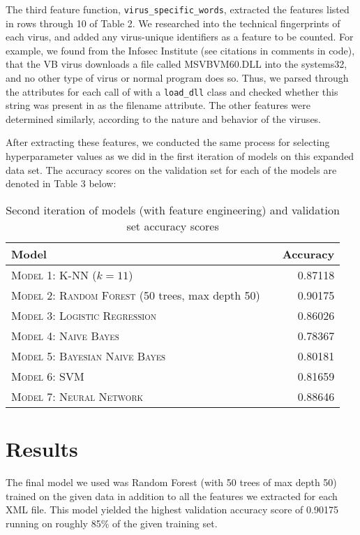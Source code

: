 \documentclass[11pt]{article}
\begin{document}
    The third feature function, \texttt{virus\_specific\_words}, extracted the features listed in rows through 10 of Table 2. We researched into the technical fingerprints of each virus, and added any virus-unique identifiers as a feature to be counted. For example, we found from the Infosec Institute (see citations in comments in code), that the VB virus downloads a file called MSVBVM60.DLL into the systems32, and no other type of virus or normal program does so. Thus, we parsed through the attributes for each call of with a \texttt{load\_dll} class and checked whether this string was present in as the filename attribute. The other features were determined similarly, according to the nature and behavior of the viruses.
    
    After extracting these features, we conducted the same process for selecting hyperparameter values as we did in the first iteration of models on this expanded data set. The accuracy scores on the validation set for each of the models are denoted in Table 3 below:
    \begin{table}[h!]
        \centering
        \begin{tabular}{llr}
         \toprule
         Model &  & Accuracy \\
         \midrule
         \textsc{Model 1: K-NN} ($k=11$) & & 0.87118 \\
         \textsc{Model 2: Random Forest} (50 trees, max depth 50) & & 0.90175\\
         \textsc{Model 3: Logistic Regression} & & 0.86026 \\
         \textsc{Model 4: Naive Bayes} & & 0.78367 \\
         \textsc{Model 5: Bayesian Naive Bayes} & &  0.80181\\
         \textsc{Model 6: SVM} & &  0.81659\\
         \textsc{Model 7: Neural Network} & & 0.88646 \\
         \bottomrule
        \end{tabular}
        \caption{\label{tab:results} Second iteration of models (with feature engineering) and validation set accuracy scores}
    \end{table}




\section{Results}
The final model we used was Random Forest (with 50 trees of max depth 50) trained on the given data in addition to all the features we extracted for each XML file. This model yielded the highest validation accuracy score of 0.90175 running on roughly 85\% of the given training set.
\end{document}
